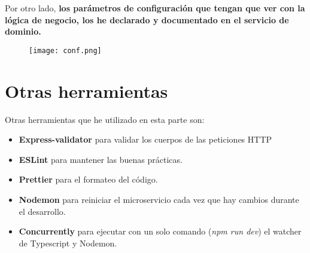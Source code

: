 	Por otro lado, \textbf{los parámetros de configuración que tengan que ver con la lógica
	de negocio, los he declarado y documentado en el servicio de dominio.}

\begin{figure}[H]
	\centering	
	\texttt{[image: conf.png]}
	\end{figure}



\section{Otras herramientas}\label{sec:tools}
Otras herramientas que he utilizado en esta parte son:
\begin{itemize}
	\item \textbf{Express-validator} para validar los cuerpos de las peticiones HTTP
	\item \textbf{ESLint} para mantener las buenas prácticas.
	\item \textbf{Prettier} para el formateo del código.
	\item \textbf{Nodemon} para reiniciar el microservicio cada vez que hay cambios durante el desarrollo.
	\item \textbf{Concurrently} para ejecutar con un solo comando (\textit{npm run dev}) el watcher de Typescript y Nodemon.
\end{itemize}